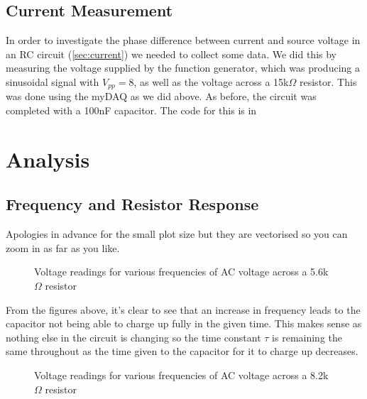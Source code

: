 \documentclass[12pt]{article}
\numberwithin{equation}{section}
\numberwithin{figure}{section}
\begin{document}
    \subsection{Current Measurement}\label{sec:currentMeasurement}
    In order to investigate the phase difference between current and source voltage in an RC circuit 
    (\autoref{sec:current}) we needed to collect some data. We did this by measuring the voltage supplied 
    by the function generator, which was producing a sinusoidal signal with $V_{pp}=8$, as well as the 
    voltage across a 15k$\Omega$ resistor. This was done using the myDAQ as we did above. As before, the 
    circuit was completed with a 100nF capacitor. The code for this is in 

    \section{Analysis}
    \subsection{Frequency and Resistor Response}\label{sec:FreqResistorResponse}
    Apologies in advance for the small plot size but they are vectorised so you can zoom in as far as you like. 
    \begin{figure}[H]%
        \centering
        \qquad
        \qquad
        \qquad
        \caption{Voltage readings for various frequencies of AC voltage across a 5.6k$\Omega$ resistor}
        \label{fig:5.6kResistor}
    \end{figure}
    
    From the figures above, it's clear to see that an increase in frequency leads to the capacitor not being 
    able to charge up fully in the given time. This makes sense as nothing else in the circuit is changing 
    so the time constant $\tau$ is remaining the same throughout as the time given to the capacitor for it 
    to charge up decreases.
    
    \begin{figure}[H]%
        \centering
        \qquad
        \qquad
        \qquad
        \caption{Voltage readings for various frequencies of AC voltage across a 8.2k$\Omega$ resistor}
        \label{fig:8.2kResistor}
    \end{figure}
\end{document}
